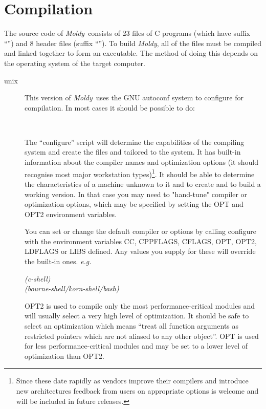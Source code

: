 \documentclass[a4paper,twoside]{report}
\newcommand{\moldy}{\emph{Moldy}}
\begin{document}
\section{Compilation}%
\label{sec:compile}
The source code of \moldy\  consists of 23 files of C programs (which have
suffix ``'') and 8 header files (suffix ``'').
To build \moldy, all of the  files must be compiled and linked
together to form an executable.  The method of doing this depends on
the operating system of the target computer.
\begin{description}
\item[unix]  
This version of \moldy\ uses the GNU autoconf system to configure for
compilation.   In most cases it should be possible to do:

\\

The ``configure'' script will determine the capabilities of the
compiling system and create the files  and
 tailored to the system.  It has built-in information
about the compiler names and optimization options (it should recognise
most major workstation types)\footnote{Since these date rapidly as
  vendors improve their compilers and introduce new architectures
  feedback from users on appropriate options is welcome and will be
  included in future releases.}.  It should be able to determine the
characteristics of a machine unknown to it and to create  and
 to build a working version.  In that case you may need to
"hand-tune" compiler or optimization options, which may be specified
by setting the OPT and OPT2 environment variables.

You can set or change the default compiler or options by calling
configure with the environment variables CC, CPPFLAGS, CFLAGS, OPT,
OPT2, LDFLAGS or LIBS defined.  Any values you supply for these will
override the built-in ones.  \emph{e.g.}


\begin{tabbing}
 \=    \emph{(c-shell)}\\
      \>   \emph{(bourne-shell/korn-shell/bash)}
\end{tabbing}

OPT2 is used to compile only the most performance-critical modules and
will usually select a very high level of optimization.  It should be
safe to select an optimization which means ``treat all function
arguments as restricted pointers which are not aliased to any other
object''.  OPT is used for less performance-critical modules and may be
set to a lower level of optimization than OPT2.


\end{description}
\end{document}
